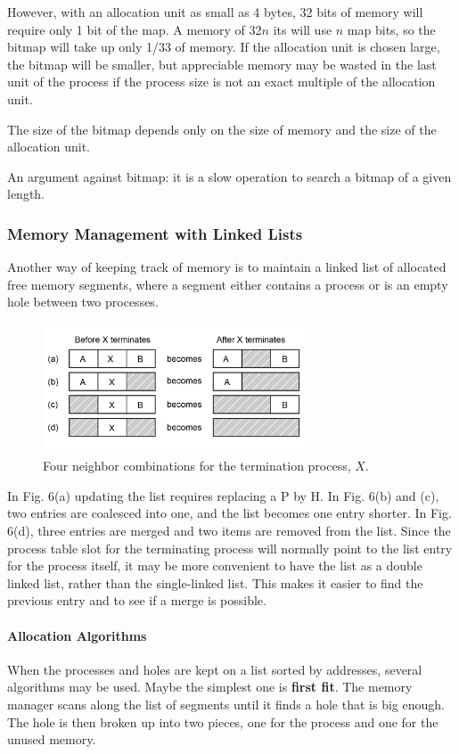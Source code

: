 \documentclass[11pt,a4paper]{article}
\begin{document}
However, with an allocation unit as small as 4 bytes, 32 bits of memory will require only 1 bit of the map. A memory of 32$n$ its will use $n$ map bits, so the bitmap will take up only 1/33 of memory. If the allocation unit is chosen large, the bitmap will be smaller, but appreciable memory may be wasted in the last unit of the process if the process size is not an exact multiple of the allocation unit.

The size of the bitmap depends only on the size of memory and the size of the allocation unit.

An argument against bitmap: it is a slow operation to search a bitmap of a given length.

\subsubsection{Memory Management with Linked Lists}
Another way of keeping track of memory is to maintain a linked list of allocated free memory segments, where a segment either contains a process or is an empty hole between two processes.

\begin{figure}[h!]
	\centering
		\includegraphics[width=300px]{img/memlink-01.png}
	\caption{Four neighbor combinations for the termination process, $X$.}
\end{figure}

In Fig. 6(a) updating the list requires replacing a P by H. In Fig. 6(b) and (c), two entries are coalesced into one, and the list becomes one entry shorter. In Fig. 6(d), three entries are merged and two items are removed from the list. Since the process table slot for the terminating process will normally point to the list entry for the process itself, it may be more convenient to have the list as a double linked list, rather than the single-linked list. This makes it easier to find the previous entry and to see if a merge is possible.

\paragraph{Allocation Algorithms}
When the processes and holes are kept on a list sorted by addresses, several algorithms may be used. Maybe the simplest one is \textbf{first fit}. The memory manager scans along the list of segments until it finds a hole that is big enough. The hole is then broken up into two pieces, one for the process and one for the unused memory. 
\end{document}
